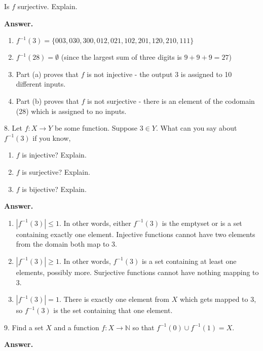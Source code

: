 \documentclass[10pt,]{book}
\theoremstyle{plain}
\theoremstyle{definition}
\theoremstyle{definition}
\theoremstyle{definition}
\numberwithin{equation}{section}
\def\N{\mathbb N}
\def\inv{^{-1}}
\begin{document}
\begin{exerciselist}
\begin{enumerate}[label=(\alph*)]
Is \(f\) surjective. Explain.
%
\end{enumerate}
\par\smallskip
\par\smallskip
\noindent\textbf{Answer.}\hypertarget{answer-23}{}\quad
\leavevmode%
\begin{enumerate}[label=(\alph*)]
\item\hypertarget{li-167}{}\(f\inv(3) = \{003, 030, 300, 012, 021, 102, 201, 120, 210, 111\}\)\item\hypertarget{li-168}{}\(f\inv(28) = \emptyset\) (since the largest sum of three digits is \(9+9+9 = 27\))\item\hypertarget{li-169}{}
Part (a) proves that \(f\) is not injective - the output 3 is assigned to 10 different inputs.
%
\item\hypertarget{li-170}{}
Part (b) proves that \(f\) is not surjective - there is an element of the codomain (28) which is assigned to no inputs.
%
\end{enumerate}
\item[8.]\hypertarget{exercise-24}{}
Let \(f:X \to Y\) be some function. Suppose \(3 \in Y\). What can you say about \(f\inv(3)\) if you know,
%
\leavevmode%
\begin{enumerate}[label=(\alph*)]
\item\hypertarget{li-171}{}\(f\) is injective? Explain.\item\hypertarget{li-172}{}\(f\) is surjective? Explain.\item\hypertarget{li-173}{}\(f\) is bijective? Explain.\end{enumerate}
\par\smallskip
\par\smallskip
\noindent\textbf{Answer.}\hypertarget{answer-24}{}\quad
\leavevmode%
\begin{enumerate}[label=(\alph*)]
\item\hypertarget{li-174}{}\(|f\inv(3)| \le 1\).  In other words, either \(f\inv(3)\) is the emptyset or is a set containing exactly one element.  Injective functions cannot have two elements from the domain both map to 3.\item\hypertarget{li-175}{}\(|f\inv(3)| \ge 1\).  In other words, \(f\inv(3)\) is a set containing at least one elements, possibly more.  Surjective functions cannot have nothing mapping to 3.\item\hypertarget{li-176}{}\(|f\inv(3)| = 1\).  There is exactly one element from \(X\) which gets mapped to 3, so \(f\inv(3)\) is the set containing that one element.\end{enumerate}
\item[9.]\hypertarget{exercise-25}{}
Find a set \(X\) and a function \(f:X \to \N\) so that \(f\inv(0) \cup f\inv(1) = X\).
%
\par\smallskip
\par\smallskip
\noindent\textbf{Answer.}\hypertarget{answer-25}{}\quad


\end{exerciselist}
\end{document}
